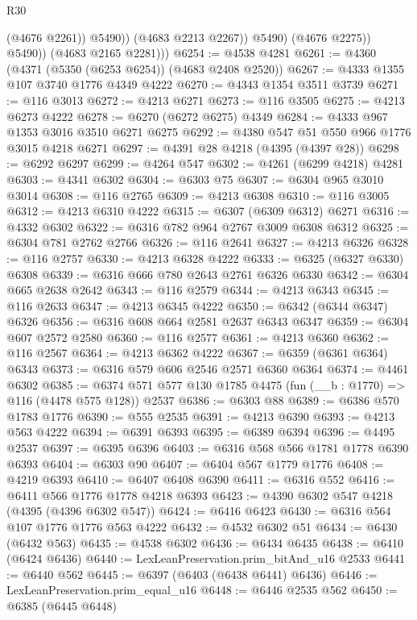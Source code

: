 \begin{lexlean}{R30}
\begin{coremodule}
{{{{{                        (@4676 @2261))
                      @5490))
                  (@4683 @2213 @2267))
                @5490)
              (@4676 @2275))
            @5490))
        (@4683 @2165 @2281)))
@6254 := @4538 @4281
@6261 := @4360 (@4371 (@5350 (@6253 @6254)) (@4683 @2408 @2520))
@6267 := @4333 @1355 @107 @3740 @1776 @4349 @4222
@6270 := @4343 @1354 @3511 @3739
@6271 := @116 @3013
@6272 := @4213 @6271
@6273 := @116 @3505
@6275 := @4213 @6273 @4222
@6278 := @6270 (@6272 @6275) @4349
@6284 := @4333 @967 @1353 @3016 @3510 @6271 @6275
@6292 := @4380 @547 @51 @550 @966 @1776 @3015 @4218 @6271
@6297 := @4391 @28 @4218 (@4395 (@4397 @28))
@6298 := @6292 @6297
@6299 := @4264 @547
@6302 := @4261 (@6299 @4218) @4281
@6303 := @4341 @6302
@6304 := @6303 @75
@6307 := @6304 @965 @3010 @3014
@6308 := @116 @2765
@6309 := @4213 @6308
@6310 := @116 @3005
@6312 := @4213 @6310 @4222
@6315 := @6307 (@6309 @6312) @6271
@6316 := @4332 @6302
@6322 := @6316 @782 @964 @2767 @3009 @6308 @6312
@6325 := @6304 @781 @2762 @2766
@6326 := @116 @2641
@6327 := @4213 @6326
@6328 := @116 @2757
@6330 := @4213 @6328 @4222
@6333 := @6325 (@6327 @6330) @6308
@6339 := @6316 @666 @780 @2643 @2761 @6326 @6330
@6342 := @6304 @665 @2638 @2642
@6343 := @116 @2579
@6344 := @4213 @6343
@6345 := @116 @2633
@6347 := @4213 @6345 @4222
@6350 := @6342 (@6344 @6347) @6326
@6356 := @6316 @608 @664 @2581 @2637 @6343 @6347
@6359 := @6304 @607 @2572 @2580
@6360 := @116 @2577
@6361 := @4213 @6360
@6362 := @116 @2567
@6364 := @4213 @6362 @4222
@6367 := @6359 (@6361 @6364) @6343
@6373 := @6316 @579 @606 @2546 @2571 @6360 @6364
@6374 := @4461 @6302
@6385 := @6374 @571 @577 @130 @1785 @4475 (fun (__b : @1770) => @116 (@4478 @575 @128)) @2537
@6386 := @6303 @88
@6389 := @6386 @570 @1783 @1776
@6390 := @555 @2535
@6391 := @4213 @6390
@6393 := @4213 @563 @4222
@6394 := @6391 @6393
@6395 := @6389 @6394
@6396 := @4495 @2537
@6397 := @6395 @6396
@6403 := @6316 @568 @566 @1781 @1778 @6390 @6393
@6404 := @6303 @90
@6407 := @6404 @567 @1779 @1776
@6408 := @4219 @6393
@6410 := @6407 @6408 @6390
@6411 := @6316 @552
@6416 := @6411 @566 @1776 @1778 @4218 @6393
@6423 := @4390 @6302 @547 @4218 (@4395 (@4396 @6302 @547))
@6424 := @6416 @6423
@6430 := @6316 @564 @107 @1776 @1776 @563 @4222
@6432 := @4532 @6302 @51
@6434 := @6430 (@6432 @563)
@6435 := @4538 @6302
@6436 := @6434 @6435
@6438 := @6410 (@6424 @6436)
@6440 := LexLeanPreservation.prim_bitAnd_u16 @2533
@6441 := @6440 @562
@6445 := @6397 (@6403 (@6438 @6441) @6436)
@6446 := LexLeanPreservation.prim_equal_u16
@6448 := @6446 @2535 @562
@6450 := @6385 (@6445 @6448)
}}}}}
\end{coremodule}
\end{lexlean}
